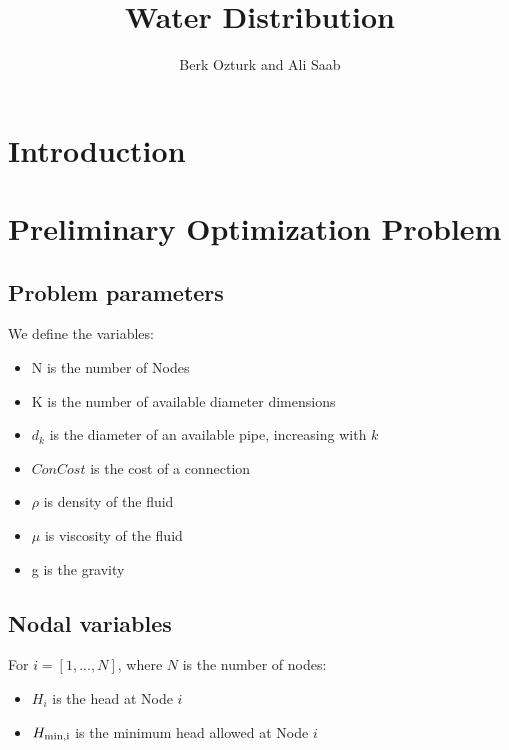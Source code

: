 \documentclass[12pt]{article}
\begin{document}
	
	
	
	\title{Water Distribution}%
	\author{Berk Ozturk and Ali Saab
	} %
	
	\maketitle
	
	\section{Introduction}
	
	
	\section{Preliminary Optimization Problem}
	
	\subsection{Problem parameters}
	
	
	We define the variables:
	
		\begin{itemize}
		\item N is the number of Nodes
		\item K is the number of available diameter dimensions
		\item $d_{k}$ is the diameter of an available pipe, increasing with $k$

		\item $ConCost$ is the cost of a connection
		\item $\rho$ is density of the fluid
		\item $\mu$ is viscosity of the fluid
		\item g is the gravity
	\end{itemize}
	
	\subsection{Nodal variables}
	
	For $i = [1, ..., N]$, where $N$ is the number of nodes:
	\begin{itemize}
		\item $H_{i}$ is the head at Node $i$
		\item $H_{\rm{min}, i}$ is the minimum head allowed at Node $i$
	\end{itemize}
	
\end{document}
